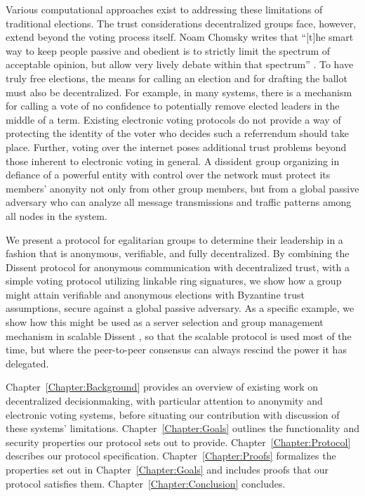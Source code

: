 Various computational approaches exist to addressing these limitations of
traditional elections. The trust considerations decentralized groups face,
however, extend beyond the voting process itself. Noam Chomsky writes that
``[t]he smart way to keep people passive and obedient is to strictly limit the
spectrum of acceptable opinion, but allow very lively debate within that
spectrum'' \cite{chomsky1998common}. To have truly free elections, the means for
calling an election and for drafting the ballot must also be decentralized. For
example, in \tocite many systems, there is a mechanism for calling a vote of no
confidence to potentially remove elected
leaders in the middle of a term. Existing electronic voting protocols do not
provide a way of protecting the identity of the voter who decides such a
referrendum should take place. Further, voting over the internet poses
additional trust problems beyond those inherent to electronic voting in general.
A dissident group organizing in defiance of a powerful entity with control over
the network must protect its members' anonyity not only from other group
members, but from a global passive adversary who can analyze all message
transmissions and traffic patterns among all nodes in the system.

We present a protocol for egalitarian groups to determine their leadership in a
fashion that is anonymous, verifiable, and fully decentralized.  By combining
the Dissent protocol for anonymous communication with decentralized
trust\cite{p2pd}, with a simple voting protocol utilizing linkable ring
signatures\cite{lrs}, we show how a group might attain verifiable and anonymous
elections with Byzantine trust assumptions, secure against a global passive
adversary.  As a specific example, we show how this might be used as a server
selection and group management mechanism in scalable Dissent \cite{din}, so that
the scalable protocol is used most of the time, but where the peer-to-peer
consensus can always rescind the power it has delegated.

Chapter~\ref{Chapter:Background} provides an overview of existing work on
decentralized decisionmaking, with particular attention to anonymity and
electronic voting systems, before situating our contribution with discussion of
these systems' limitations. Chapter~\ref{Chapter:Goals} outlines the
functionality and security properties our protocol sets out to provide.
Chapter~\ref{Chapter:Protocol} describes our protocol specification.
Chapter~\ref{Chapter:Proofs} formalizes the properties set out in
Chapter~\ref{Chapter:Goals} and includes proofs that our protocol
satisfies them. Chapter~\ref{Chapter:Conclusion} concludes.
%
%
%
%
